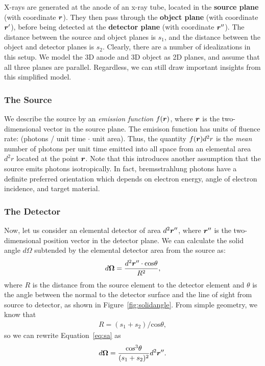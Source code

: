 \documentclass[mphy386-notes.tex]{subfiles}
\begin{document}
X-rays are generated at the anode of an x-ray tube, located in the
\textbf{source plane} (with coordinate $\boldsymbol{r}$). They then pass through the
\textbf{object plane} (with coordinate $\boldsymbol{r}'$), before
being detected at the \textbf{detector plane} (with coordinate $\boldsymbol{r}''$).
The distance between the source and object planes is $s_1$, and the distance
between the object and detector planes is $s_2$. Clearly, there are a number
of idealizations in this setup. We model the 3D anode and 3D object as
2D planes, and assume that all three planes are parallel. Regardless,
we can still draw important insights from this simplified model.

\subsubsection{The Source}

We describe the source by an \textit{emission function} $f(\boldsymbol{r})$, where
$\boldsymbol{r}$ is the two-dimensional vector in the source plane. The emisison
function has units of fluence rate: (photons / unit time $\cdot$ unit
area). Thus, the quantity $f(\boldsymbol{r})d^2 r$ is the \textit{mean} number of
photons per unit time emitted into all space from an elemental area $d^2 r$
located at the point $\boldsymbol{r}$. Note that this introduces another assumption that
the source emits photons isotropically. In fact, bremsstrahlung photons have
a definite preferred orientation which depends on electron energy, angle of
electron incidence, and target material.


\subsubsection{The Detector}

Now, let us consider an elemental detector of area $d^2\boldsymbol{r}''$, where
$\boldsymbol{r}''$ is the two-dimensional position vector in the detector plane.
We can calculate the solid angle $d\Omega$ subtended by the elemental
detector area from the source as:
\begin{align}
  d\boldsymbol{\Omega} = \frac{d^2\boldsymbol{r}''\cdot\text{cos}\theta}{R^2},
  \label{eq:sa}
\end{align}
where $R$ is the distance from the source element to the detector element and
$\theta$ is the angle between the normal to the detector surface and the line of
sight from source to detector, as shown in Figure~\ref{fig:solidangle}. From
simple geometry, we know that
\begin{align}
  R = (s_1 + s_2) / \text{cos}\theta,
\end{align}
so we can rewrite Equation~\ref{eq:sa} as
\begin{align}
  d\boldsymbol{\Omega} = \frac{\text{cos}^3\theta}{(s_1 + s_2)^2}d^2\boldsymbol{r}''.
\end{align}
\end{document}
